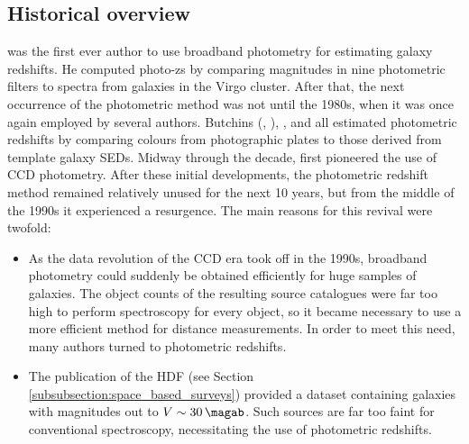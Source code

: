 \subsection{Historical overview}\label{subsection:photoz_history}
\cite{1962IAUS...15..390B} was the first ever author to use broadband photometry for estimating galaxy redshifts. He computed photo-zs by comparing magnitudes in nine photometric filters to spectra from galaxies in the Virgo cluster.  After that, the next occurrence of the photometric method was not until the 1980s, when it was once again employed by several authors. Butchins (\citeyear{1981A&A....97..407B}, \citeyear{1983MNRAS.203.1239B}), \cite{1982ApJ...257L..57P}, and \cite{1985AJ.....90..418K} all estimated photometric redshifts by comparing colours from photographic plates to those derived from template galaxy SEDs. Midway through the decade, \cite{1986ApJ...303..154L} first pioneered the use of CCD photometry. After these initial developments, the photometric redshift method remained relatively unused for the next 10 years, but from the middle of the 1990s it experienced a resurgence. The main reasons for this revival were twofold:

 


\begin{itemize}
    \item As the data revolution of the CCD era took off in the 1990s, broadband photometry could suddenly be obtained efficiently for huge samples of galaxies. The object counts of the resulting source catalogues were far too high to perform spectroscopy for every object, so it became necessary to use a more efficient method for distance measurements. In order to meet this need, many authors turned to photometric redshifts. 
    
    \item The publication of the HDF (see Section \ref{subsubsection:space_based_surveys}) provided a dataset containing galaxies with magnitudes out to $V \sim \SI{30}{\magab}$. Such sources are far too faint for conventional spectroscopy, necessitating the use of photometric redshifts. 
\end{itemize}


